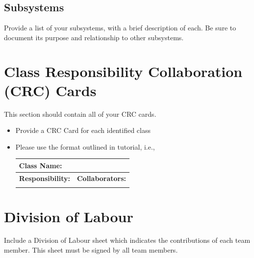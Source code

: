 \documentclass[]{article}
\begin{document}
\subsection{Subsystems}
\label{sub:subsystems}
 Provide a list of your subsystems, with a brief description of each. Be sure to document its purpose and relationship to other subsystems.


	
\section{Class Responsibility Collaboration (CRC) Cards}
\label{sec:class_responsibility_collaboration_crc_cards}
This section should contain all of your CRC cards.

\begin{itemize}
	\item Provide a CRC Card for each identified class
	\item Please use the format outlined in tutorial, i.e., 
	\begin{table}[ht]
		\centering
		\begin{tabular}{|p{5cm}|p{5cm}|}
		\hline 
		 \multicolumn{2}{|l|}{\textbf{Class Name:}} \\
		\hline
		\textbf{Responsibility:} & \textbf{Collaborators:} \\
		\hline
		\vspace{1in} & \\
		\hline
		\end{tabular}
	\end{table}
	
\end{itemize}

\appendix
\section{Division of Labour}
\label{sec:division_of_labour}
Include a Division of Labour sheet which indicates the contributions of each team member. This sheet must be signed by all team members.
\end{document}
